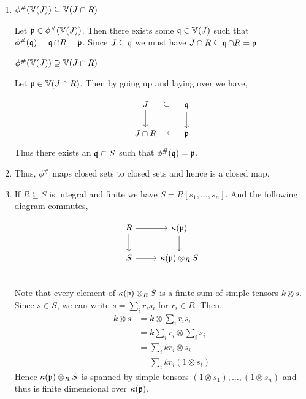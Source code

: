 \documentclass[Notebook.tex]{subfiles}
\begin{document}
\begin{solution}
    \bbni 
    \begin{enumerate}
        \item $\phi^{\#}(\mathbb V(J)) \subseteq \mathbb V(J\cap R)$
        
        Let $\operatorname{\mathfrak{p}} \in \phi^{\#}(\mathbb V(J))$. Then there exists some $\operatorname{\mathfrak{q}} \in \mathbb V(J)$ such that $\phi^{\#}(\operatorname{\mathfrak{q}}) =  \operatorname{\mathfrak{q}} \cap R = \operatorname{\mathfrak{p}}$. Since $J \subseteq \operatorname{\mathfrak{q}}$ we must have $J \cap R \subseteq \operatorname{\mathfrak{q}} \cap R = \operatorname{\mathfrak{p}}$.
        
        $\phi^{\#}(\mathbb V(J)) \supseteq \mathbb V(J\cap R)$
        
        Let $\operatorname{\mathfrak{p}} \in \mathbb V(J\cap R)$. Then by going up and laying over we have, 

        \[\begin{tikzcd}
            J \arrow[d] \arrow[r, phantom, "\subseteq"] & \fq \arrow[d]\\ 
            J \cap R \arrow[r, phantom, "\subseteq"] & \fp
        \end{tikzcd}\]
        Thus there exists an $\operatorname{\mathfrak{q}} \subset S$ such that $\phi^{\#}(\operatorname{\mathfrak{q}}) = \operatorname{\mathfrak{p}}$. 

        \item Thus, $\phi^{\#}$ maps closed sets to closed sets and hence is a closed map. 
        
        \item If $R \subseteq S$ is integral and finite we have $S = R[s_1, \ldots, s_n]$. And the following diagram commutes, 
        
        \[\begin{tikzcd}
            R \arrow[r] \arrow[d] & \kappa(\fp)  \arrow[d]\\ 
            S  \arrow[r] & \kappa(\fp) \otimes_R S \\ 
        \end{tikzcd}\]
       Note that every element of $\kappa(\operatorname{\mathfrak{p}}) \otimes_R S$ is a finite sum of simple tensors $k \otimes s$. Since $s \in S$, we can write $s = \sum_i r_i s_i$ for $r_i \in R$. Then, 
        \begin{align*}
            k \otimes s &= k \otimes \sum_i r_i s_i\\ 
            &= k  \sum_i r_i \otimes \sum_i s_i\\ 
            &=  \sum_i k r_i \otimes  s_i\\ 
            &=  \sum_i k r_i (1 \otimes  s_i)
        \end{align*}
        Hence $\kappa(\operatorname{\mathfrak{p}}) \otimes_R S$ is spanned by simple tensors $(1 \otimes s_1), \ldots, (1 \otimes s_n)$ and thus is finite dimensional over $\kappa(\operatorname{\mathfrak{p}})$. 
    \end{enumerate}
\end{solution}
\end{document}
